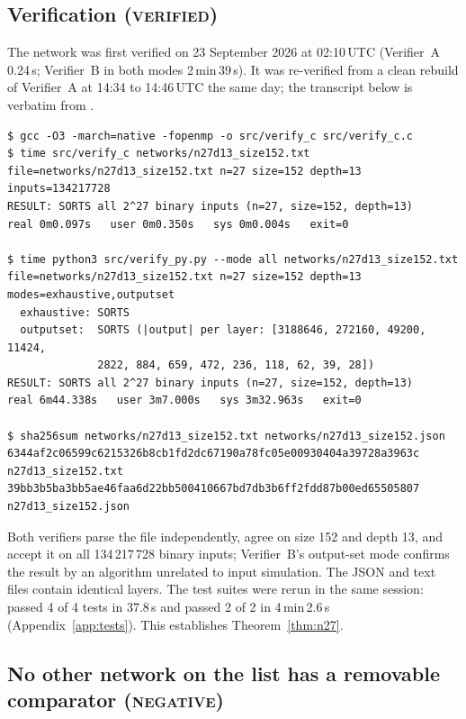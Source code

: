 \documentclass[11pt,a4paper]{article}
\theoremstyle{plain}
\theoremstyle{definition}
\theoremstyle{remark}
\newcommand{\VER}{\textsc{verified}}
\newcommand{\NEG}{\textsc{negative}}
\begin{document}
\subsection{Verification (\VER)}\label{sec:verify27}

The network was first verified on 23 September 2026 at 02:10\,UTC (Verifier~A 0.24\,s; Verifier~B in both modes 2\,min\,39\,s). It was re-verified from a clean rebuild of Verifier~A at 14:34 to 14:46\,UTC the same day; the transcript below is verbatim from .

{\small
\begin{verbatim}
$ gcc -O3 -march=native -fopenmp -o src/verify_c src/verify_c.c
$ time src/verify_c networks/n27d13_size152.txt
file=networks/n27d13_size152.txt n=27 size=152 depth=13 inputs=134217728
RESULT: SORTS all 2^27 binary inputs (n=27, size=152, depth=13)
real 0m0.097s   user 0m0.350s   sys 0m0.004s   exit=0

$ time python3 src/verify_py.py --mode all networks/n27d13_size152.txt
file=networks/n27d13_size152.txt n=27 size=152 depth=13 modes=exhaustive,outputset
  exhaustive: SORTS
  outputset:  SORTS (|output| per layer: [3188646, 272160, 49200, 11424,
              2822, 884, 659, 472, 236, 118, 62, 39, 28])
RESULT: SORTS all 2^27 binary inputs (n=27, size=152, depth=13)
real 6m44.338s   user 3m7.000s   sys 3m32.963s   exit=0

$ sha256sum networks/n27d13_size152.txt networks/n27d13_size152.json
6344af2c06599c6215326b8cb1fd2dc67190a78fc05e00930404a39728a3963c  n27d13_size152.txt
39bb3b5ba3bb5ae46faa6d22bb500410667bd7db3b6ff2fdd87b00ed65505807  n27d13_size152.json
\end{verbatim}
}

\noindent Both verifiers parse the file independently, agree on size 152 and depth 13, and accept it on all 134\,217\,728 binary inputs; Verifier~B's output-set mode confirms the result by an algorithm unrelated to input simulation. The JSON and text files contain identical layers. The test suites were rerun in the same session:  passed 4 of 4 tests in 37.8\,s and  passed 2 of 2 in 4\,min\,2.6\,s (Appendix~\ref{app:tests}). This establishes Theorem~\ref{thm:n27}.

\subsection{No other network on the list has a removable comparator (\NEG)}\label{sec:sweep}
\end{document}
